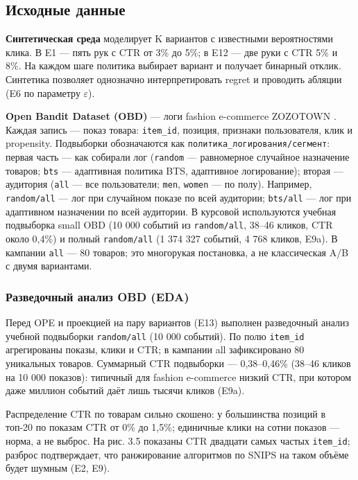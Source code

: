 \subsection{Исходные данные}\label{ux438ux441ux445ux43eux434ux43dux44bux435-ux434ux430ux43dux43dux44bux435}

\textbf{Синтетическая среда} моделирует K вариантов с известными вероятностями клика. В E1 --- пять рук с CTR от 3\% до 5\%; в E12 --- две руки с CTR 5\% и 8\%. На каждом шаге политика выбирает вариант и получает бинарный отклик. Синтетика позволяет однозначно интерпретировать regret и проводить абляции (E6 по параметру $\varepsilon$).

\textbf{Open Bandit Dataset (OBD)} --- логи fashion e-commerce ZOZOTOWN \cite{ref26}. Каждая запись --- показ товара: \texttt{item\_id}, позиция, признаки пользователя, клик и propensity. Подвыборки обозначаются как \texttt{политика\_логирования/сегмент}: первая часть --- как собирали лог (\texttt{random} --- равномерное случайное назначение товаров; \texttt{bts} --- адаптивная политика BTS, адаптивное логирование); вторая --- аудитория (\texttt{all} --- все пользователи; \texttt{men}, \texttt{women} --- по полу). Например, \texttt{random/all} --- лог при случайном показе по всей аудитории; \texttt{bts/all} --- лог при адаптивном назначении по всей аудитории. В курсовой используются учебная подвыборка small OBD (10 000 событий из \texttt{random/all}, 38--46 кликов, CTR около 0,4\%) и полный \texttt{random/all} (1 374 327 событий, 4 768 кликов, E9a). В кампании \texttt{all} --- 80 товаров; это многорукая постановка, а не классическая A/B с двумя вариантами.

\subsubsection{Разведочный анализ OBD (EDA)}\label{ux440ux430ux437ux432ux435ux434ux43eux447ux43dux44bux439-ux430ux43dux430ux43bux438ux437-obd-eda}

Перед OPE и проекцией на пару вариантов (E13) выполнен разведочный анализ учебной подвыборки \texttt{random/all} (10 000 событий). По полю \texttt{item\_id} агрегированы показы, клики и CTR; в кампании all зафиксировано 80 уникальных товаров. Суммарный CTR подвыборки --- 0,38--0,46\% (38--46 кликов на 10 000 показов): типичный для fashion e-commerce низкий CTR, при котором даже миллион событий даёт лишь тысячи кликов (E9a).

Распределение CTR по товарам сильно скошено: у большинства позиций в топ-20 по показам CTR от 0\% до 1,5\%; единичные клики на сотни показов --- норма, а не выброс. На рис. 3.5 показаны CTR двадцати самых частых \texttt{item\_id}; разброс подтверждает, что ранжирование алгоритмов по SNIPS на таком объёме будет шумным (E2, E9).


